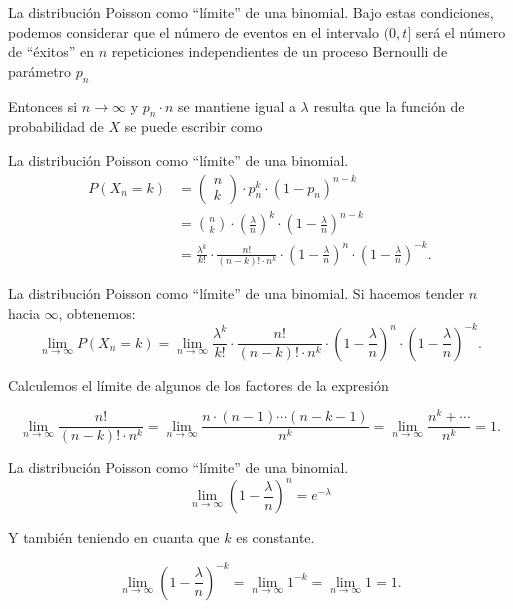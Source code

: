 \documentclass[
  ignorenonframetext,
  aspectratio=169]{beamer}
\begin{document}
\begin{frame}{La distribución Poisson como ``límite'' de una binomial.}
\protect\hypertarget{la-distribuciuxf3n-poisson-como-luxedmite-de-una-binomial.-1}{}
Bajo estas condiciones, podemos considerar que el número de eventos en
el intervalo \((0,t]\) será el número de ``éxitos'' en \(n\)
repeticiones independientes de un proceso Bernoulli de parámetro \(p_n\)

Entonces si \(n\to\infty\) y \(p_n\cdot n\) se mantiene igual a
\(\lambda\) resulta que la función de probabilidad de \(X\) se puede
escribir como
\end{frame}

\begin{frame}{La distribución Poisson como ``límite'' de una binomial.}
\protect\hypertarget{la-distribuciuxf3n-poisson-como-luxedmite-de-una-binomial.-2}{}
\[
\begin{array}{rl}
P(X_n=k)&=\left(\begin{array}{c} n\\ k\end{array}\right) \cdot p_n^k\cdot  (1-p_n)^{n-k}
\\
&= {n\choose k}\cdot \left(\frac{\lambda}{n}\right)^{k}\cdot \left(1-\frac{\lambda}{n}\right)^{n-k}\\
&=
\frac{\lambda^k}{k!}\cdot\frac{n!}{(n-k)!\cdot n^k}\cdot
\left(1-\frac{\lambda}{n}\right)^{n}\cdot \left(1-\frac{\lambda}{n}\right)^{-k}.
\end{array}
\]
\end{frame}

\begin{frame}{La distribución Poisson como ``límite'' de una binomial.}
\protect\hypertarget{la-distribuciuxf3n-poisson-como-luxedmite-de-una-binomial.-3}{}
Si hacemos tender \(n\) hacia \(\infty\), obtenemos: \[
\lim_{n\to \infty} P(X_n=k) = \lim_{n\to \infty} \frac{\lambda^k}{k!}\cdot\frac{n!}{(n-k)!\cdot n^k} \cdot
\left(1-\frac{\lambda}{n}\right)^{n}\cdot \left(1-\frac{\lambda}{n}\right)^{-k}.
\]

Calculemos el límite de algunos de los factores de la expresión

\[
\displaystyle\lim_{n\to \infty}\frac{n!}{(n-k)!\cdot n^k}= \lim_{n\to \infty}\frac{n\cdot (n-1)\cdots (n-k-1)}{n^k}
=\lim_{n\to \infty}\frac{n^{k}+\cdots}{n^k}=1.
\]
\end{frame}

\begin{frame}{La distribución Poisson como ``límite'' de una binomial.}
\protect\hypertarget{la-distribuciuxf3n-poisson-como-luxedmite-de-una-binomial.-4}{}
\[
\lim_{n\to \infty} \left(1-\frac{\lambda}{n}\right)^{n}=e^{-\lambda}
\]

Y también teniendo en cuanta que \(k\) es constante.

\[
\lim_{n\to \infty} \left(1-\frac{\lambda}{n}\right)^{-k}=\lim_{n\to \infty} 1^{-k}=\lim_{n\to \infty}  1=1.
\]
\end{frame}
\end{document}
